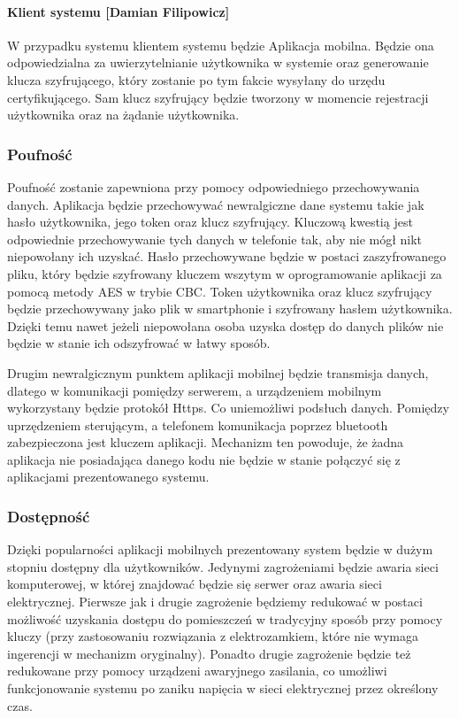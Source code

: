 		\paragraph*{Klient systemu [Damian Filipowicz]}
		W przypadku systemu \NazwaSys \space klientem systemu będzie Aplikacja mobilna. Będzie ona odpowiedzialna za uwierzytelnianie użytkownika w systemie oraz generowanie klucza szyfrującego, który zostanie po tym fakcie wysyłany do urzędu certyfikującego. Sam klucz szyfrujący będzie tworzony w momencie rejestracji użytkownika oraz na żądanie użytkownika.\cite{PKI}
		
	\subsubsection{Poufność}
	Poufność zostanie zapewniona przy pomocy odpowiedniego przechowywania danych. Aplikacja będzie przechowywać newralgiczne dane systemu takie jak hasło użytkownika, jego token oraz klucz szyfrujący. Kluczową kwestią jest odpowiednie przechowywanie tych danych w telefonie tak, aby nie mógł nikt niepowołany ich uzyskać. Hasło przechowywane będzie w postaci zaszyfrowanego pliku, który będzie szyfrowany kluczem wszytym w oprogramowanie aplikacji za pomocą metody AES w trybie CBC. Token użytkownika oraz klucz szyfrujący będzie przechowywany jako plik w smartphonie i szyfrowany hasłem użytkownika. Dzięki temu nawet jeżeli niepowołana osoba uzyska dostęp do danych plików nie będzie w stanie ich odszyfrować w łatwy sposób.
	
	Drugim newralgicznym punktem aplikacji mobilnej będzie transmisja danych, dlatego w komunikacji pomiędzy serwerem, a urządzeniem mobilnym wykorzystany będzie protokół Https. Co uniemożliwi podsłuch danych. Pomiędzy uprzędzeniem sterującym, a telefonem komunikacja poprzez bluetooth zabezpieczona jest kluczem aplikacji. Mechanizm ten powoduje, że żadna aplikacja nie posiadająca danego kodu nie będzie w stanie połączyć się z aplikacjami prezentowanego systemu.	
	
	\subsubsection{Dostępność}
	Dzięki popularności aplikacji mobilnych prezentowany system będzie w dużym stopniu dostępny dla użytkowników. Jedynymi zagrożeniami będzie awaria sieci komputerowej, w której znajdować będzie się serwer oraz awaria sieci elektrycznej. Pierwsze jak i drugie zagrożenie będziemy redukować w postaci możliwość uzyskania dostępu do pomieszczeń w tradycyjny sposób przy pomocy kluczy (przy zastosowaniu rozwiązania z elektrozamkiem, które nie wymaga ingerencji w mechanizm oryginalny). Ponadto drugie zagrożenie będzie też redukowane przy pomocy urządzeni awaryjnego zasilania, co umożliwi funkcjonowanie systemu po zaniku napięcia w sieci elektrycznej przez określony czas.
